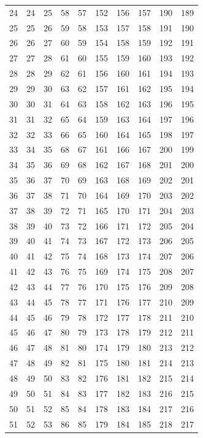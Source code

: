 \begin{longtable}{rrrrr@{\qquad}rrrrr}
24 & 24 & 25 & 58 & 57 & 152 & 156 & 157 & 190 & 189 \\
25 & 25 & 26 & 59 & 58 & 153 & 157 & 158 & 191 & 190 \\
26 & 26 & 27 & 60 & 59 & 154 & 158 & 159 & 192 & 191 \\
27 & 27 & 28 & 61 & 60 & 155 & 159 & 160 & 193 & 192 \\
28 & 28 & 29 & 62 & 61 & 156 & 160 & 161 & 194 & 193 \\
29 & 29 & 30 & 63 & 62 & 157 & 161 & 162 & 195 & 194 \\
30 & 30 & 31 & 64 & 63 & 158 & 162 & 163 & 196 & 195 \\
31 & 31 & 32 & 65 & 64 & 159 & 163 & 164 & 197 & 196 \\
32 & 32 & 33 & 66 & 65 & 160 & 164 & 165 & 198 & 197 \\
33 & 34 & 35 & 68 & 67 & 161 & 166 & 167 & 200 & 199 \\
34 & 35 & 36 & 69 & 68 & 162 & 167 & 168 & 201 & 200 \\
35 & 36 & 37 & 70 & 69 & 163 & 168 & 169 & 202 & 201 \\
36 & 37 & 38 & 71 & 70 & 164 & 169 & 170 & 203 & 202 \\
37 & 38 & 39 & 72 & 71 & 165 & 170 & 171 & 204 & 203 \\
38 & 39 & 40 & 73 & 72 & 166 & 171 & 172 & 205 & 204 \\
39 & 40 & 41 & 74 & 73 & 167 & 172 & 173 & 206 & 205 \\
40 & 41 & 42 & 75 & 74 & 168 & 173 & 174 & 207 & 206 \\
41 & 42 & 43 & 76 & 75 & 169 & 174 & 175 & 208 & 207 \\
42 & 43 & 44 & 77 & 76 & 170 & 175 & 176 & 209 & 208 \\
43 & 44 & 45 & 78 & 77 & 171 & 176 & 177 & 210 & 209 \\
44 & 45 & 46 & 79 & 78 & 172 & 177 & 178 & 211 & 210 \\
45 & 46 & 47 & 80 & 79 & 173 & 178 & 179 & 212 & 211 \\
46 & 47 & 48 & 81 & 80 & 174 & 179 & 180 & 213 & 212 \\
47 & 48 & 49 & 82 & 81 & 175 & 180 & 181 & 214 & 213 \\
48 & 49 & 50 & 83 & 82 & 176 & 181 & 182 & 215 & 214 \\
49 & 50 & 51 & 84 & 83 & 177 & 182 & 183 & 216 & 215 \\
50 & 51 & 52 & 85 & 84 & 178 & 183 & 184 & 217 & 216 \\
51 & 52 & 53 & 86 & 85 & 179 & 184 & 185 & 218 & 217 \\

\end{longtable}
